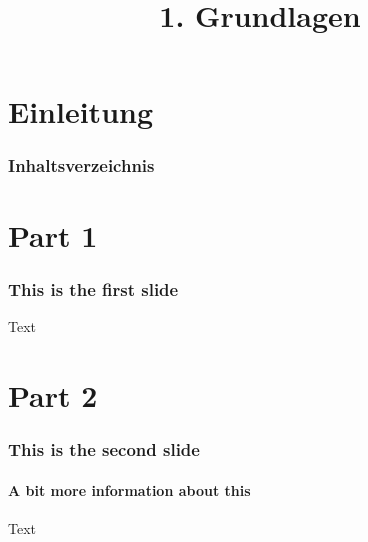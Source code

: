 

\title{\\{\scriptsize 1. Grundlagen}}




    

    \section{Einleitung}
    \begin{frame}
        \frametitle{Inhaltsverzeichnis}
        \tableofcontents[currentsection]
    \end{frame}

    \section{Part 1}
    \begin{frame}
        \frametitle{This is the first slide}
        Text
    \end{frame}

    \section{Part 2}
    \begin{frame}
        \frametitle{This is the second slide}
        \framesubtitle{A bit more information about this}
        Text
    \end{frame}

